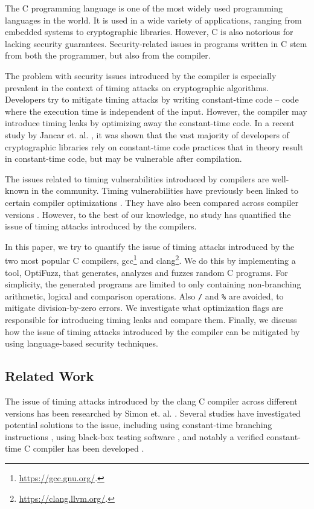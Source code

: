 The C programming language is one of the most widely used programming languages in the world. 
It is used in a wide variety of applications, ranging from embedded systems to cryptographic libraries. 
However, C is also notorious for lacking security guarantees.
Security-related issues in programs written in C stem from both the programmer, but also from the compiler.

The problem with security issues introduced by the compiler is especially prevalent in the context of timing attacks on cryptographic algorithms. 
Developers try to mitigate timing attacks by writing constant-time code -- code where the execution time is independent of the input.
However, the compiler may introduce timing leaks by optimizing away the constant-time code.
In a recent study by Jancar et. al. \cite{developer-survey-timing-attacks}, it was shown that the vast majority of developers of cryptographic libraries rely on constant-time code practices that in theory result in constant-time code, but may be vulnerable after compilation.

The issues related to timing vulnerabilities introduced by compilers are well-known in the community.
Timing vulnerabilities have previously been linked to certain compiler optimizations \cite{optimizations-linked-to-timing-attacks}.
They have also been compared across compiler versions \cite{what-you-c}.
However, to the best of our knowledge, no study has quantified the issue of timing attacks introduced by the compilers.

In this paper, we try to quantify the issue of timing attacks introduced by the two most popular C compilers, gcc\footnote{\url{https://gcc.gnu.org/}.} and clang\footnote{\url{https://clang.llvm.org/}.}.
We do this by implementing a tool, OptiFuzz, that generates, analyzes and fuzzes random C programs.
For simplicity, the generated programs are limited to only containing non-branching arithmetic, logical and comparison operations.
Also \texttt{/} and \texttt{\%} are avoided, to mitigate division-by-zero errors.
We investigate what optimization flags are responsible for introducing timing leaks and compare them.
Finally, we discuss how the issue of timing attacks introduced by the compiler can be mitigated by using language-based security techniques.

\subsection{Related Work}
The issue of timing attacks introduced by the clang C compiler across different versions has been researched by Simon et. al. \cite{what-you-c}. 
Several studies have investigated potential solutions to the issue, including using constant-time branching instructions \cite{what-you-c}, using black-box testing software \cite{dudect}, and notably a verified constant-time C compiler has been developed \cite{verified-constant-time-c-comiler}.

